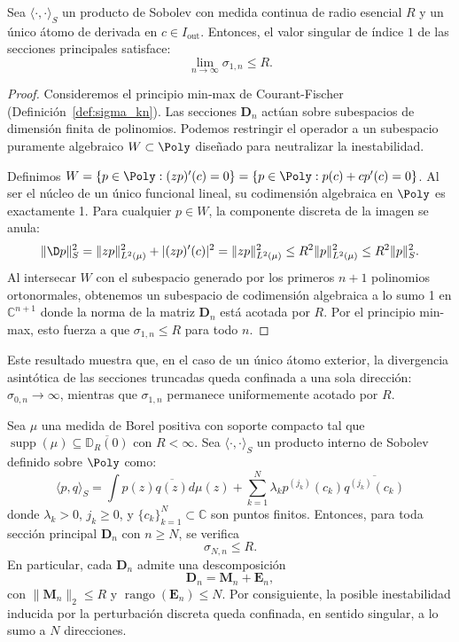 \begin{thm}\label{thm:acotacion_sigma_1}
	Sea $\langle \cdot, \cdot \rangle_S$ un producto de Sobolev con medida continua de radio esencial $R$ y un único átomo de derivada en $c \in I_{\mathrm{out}}$. Entonces, el valor singular de índice $1$ de las secciones principales satisface:
	$$ \lim_{n \to \infty} \sigma_{1,n} \le R. $$
\end{thm}

\begin{proof}
	Consideremos el principio min-max de Courant-Fischer (Definición~\ref{def:sigma_kn}). Las secciones $\mathbf{D}_n$ actúan sobre subespacios de dimensión finita de polinomios. Podemos restringir el operador a un subespacio puramente algebraico $W \subset \Poly$ diseñado para neutralizar la inestabilidad.

	Definimos $W = \{ p \in \Poly : (zp)'(c) = 0 \} = \{ p \in \Poly : p(c) + c p'(c) = 0 \}$. Al ser el núcleo de un único funcional lineal, su codimensión algebraica en $\Poly$ es exactamente 1. Para cualquier $p \in W$, la componente discreta de la imagen se anula:
	$$ \|\D p\|_S^2 = \|zp\|_{L^2(\mu)}^2 + |(zp)'(c)|^2 = \|zp\|_{L^2(\mu)}^2 \le R^2 \|p\|_{L^2(\mu)}^2 \le R^2 \|p\|_S^2. $$
	Al intersecar $W$ con el subespacio generado por los primeros $n+1$ polinomios ortonormales, obtenemos un subespacio de codimensión algebraica a lo sumo 1 en $\mathbb{C}^{n+1}$ donde la norma de la matriz $\mathbf{D}_n$ está acotada por $R$. Por el principio min-max, esto fuerza a que $\sigma_{1,n} \le R$ para todo $n$.
\end{proof}

Este resultado muestra que, en el caso de un único átomo exterior, la divergencia asintótica de las secciones truncadas queda confinada a una sola dirección: $\sigma_{0,n} \to \infty$, mientras que $\sigma_{1,n}$ permanece uniformemente acotado por $R$.

\begin{thm}\label{thm:control_singular_escape}
	Sea $\mu$ una medida de Borel positiva con soporte compacto tal que $\operatorname{supp}(\mu) \subseteq \overline{\mathbb{D}_R(0)}$ con $R < \infty$. Sea $\langle \cdot, \cdot \rangle_S$ un producto interno de Sobolev definido sobre $\Poly$ como:
	\begin{equation}\label{eq:sobolev_general_singular}
		\langle p, q \rangle_S = \int p(z)\overline{q(z)} d\mu(z) + \sum_{k=1}^N \lambda_k p^{(j_k)}(c_k) \overline{q^{(j_k)}(c_k)}
	\end{equation}
	donde $\lambda_k > 0$, $j_k \ge 0$, y $\{c_k\}_{k=1}^N \subset \mathbb{C}$ son puntos finitos. Entonces, para toda sección principal $\mathbf{D}_n$ con $n \ge N$, se verifica
	\[
		\sigma_{N,n} \le R.
	\]
	En particular, cada $\mathbf{D}_n$ admite una descomposición
	\[
		\mathbf{D}_n = \mathbf{M}_n + \mathbf{E}_n,
	\]
	con $\|\mathbf{M}_n\|_2 \le R$ y $\operatorname{rango}(\mathbf{E}_n) \le N$. Por consiguiente, la posible inestabilidad inducida por la perturbación discreta queda confinada, en sentido singular, a lo sumo a $N$ direcciones.
\end{thm}

